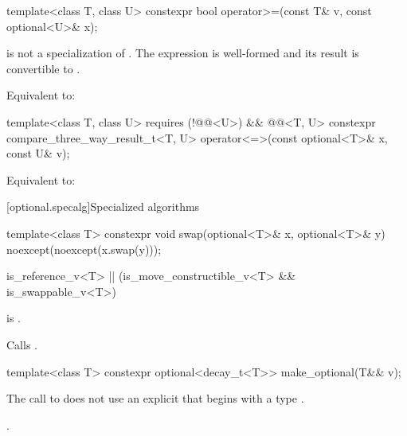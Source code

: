 %
\begin{itemdecl}
template<class T, class U> constexpr bool operator>=(const T& v, const optional<U>& x);
\end{itemdecl}

\begin{itemdescr}
\pnum
\constraints
{} is not a specialization of .
The expression  is well-formed and
its result is convertible to .

\pnum
\effects
Equivalent to: 
\end{itemdescr}

%
\begin{itemdecl}
template<class T, class U>
    requires (!@@<U>) && @@<T, U>
  constexpr compare_three_way_result_t<T, U>
    operator<=>(const optional<T>& x, const U& v);
\end{itemdecl}

\begin{itemdescr}
\pnum
\effects
Equivalent to: 
\end{itemdescr}

[optional.specalg]{Specialized algorithms}

%
\begin{itemdecl}
template<class T>
  constexpr void swap(optional<T>& x, optional<T>& y) noexcept(noexcept(x.swap(y)));
\end{itemdecl}

\begin{itemdescr}
\pnum
\constraints
\begin{codeblock}
is_reference_v<T> || (is_move_constructible_v<T> && is_swappable_v<T>)
\end{codeblock}
is .

\pnum
\effects
Calls .
\end{itemdescr}

%
\begin{itemdecl}
template<class T> constexpr optional<decay_t<T>> make_optional(T&& v);
\end{itemdecl}

\begin{itemdescr}
\pnum
\constraints
The call to  does not use
an explicit  that
begins with a type .

\pnum
\returns
{}.
\end{itemdescr}

